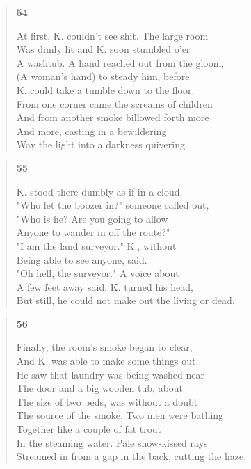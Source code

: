 \documentclass{article}
\begin{document}
\begin{verse}
  \begin{center}
    \textbf{54} \\
  \end{center}
  At first, K. couldn't see shit. The large room \\
  Was dimly lit and K. soon stumbled o'er \\
  A washtub. A hand reached out from the gloom, \\
  (A woman's hand) to steady him, before \\
  K. could take a tumble down to the floor. \\
  From one corner came the screams of children \\
  And from another smoke billowed forth more \\
  And more, casting in a bewildering \\
  Way the light into a darkness quivering.
\end{verse}
\begin{verse}
  \begin{center}
    \textbf{55} \\
  \end{center}
  K. stood there dumbly as if in a cloud. \\
  "Who let the boozer in?" someone called out, \\
  "Who is he? Are you going to allow \\
  Anyone to wander in off the route?" \\
  "I am the land surveyor." K., without \\
  Being able to see anyone, said. \\
  "Oh hell, the surveyor." A voice about \\
  A few feet away said. K. turned his head, \\
  But still, he could not make out the living or dead.
\end{verse}
\newpage
\begin{verse}
  \begin{center}
    \textbf{56} \\
  \end{center}
  Finally, the room's smoke began to clear, \\
  And K. was able to make some things out. \\
  He saw that laundry was being washed near \\
  The door and a big wooden tub, about \\
  The size of two beds, was without a doubt \\
  The source of the smoke. Two men were bathing \\
  Together like a couple of fat trout \\
  In the steaming water. Pale snow-kissed rays \\
  Streamed in from a gap in the back, cutting the haze.
\end{verse}
\end{document}
